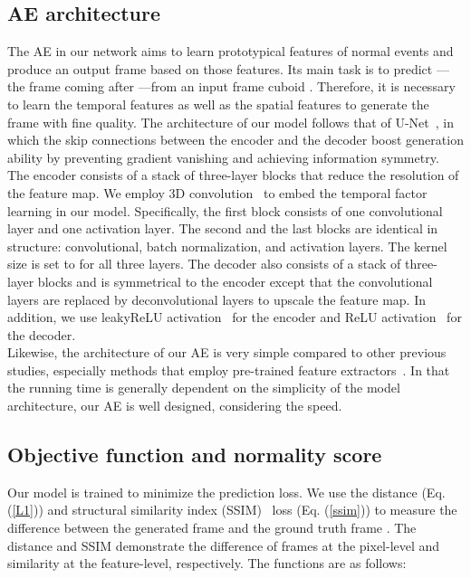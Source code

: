 \documentclass[10pt,twocolumn,letterpaper]{article}
\begin{document}
\subsection{AE architecture}
The AE in our network aims to learn prototypical features of normal events and produce an output frame based on those features. Its main task is to predict —the frame coming after —from an input frame cuboid .  Therefore, it is necessary to learn the temporal features as well as the spatial features to generate the frame with fine quality. The architecture of our model follows that of U-Net~\cite{ronneberger2015u}, in which the skip connections between the encoder and the decoder boost generation ability by preventing gradient vanishing and achieving information symmetry. The encoder consists of a stack of three-layer blocks that reduce the resolution of the feature map. We employ 3D convolution~\cite{tran2015learning} to embed the temporal factor learning in our model. Specifically, the first block consists of one convolutional layer and one activation layer. The second and the last blocks are identical in structure: convolutional, batch normalization, and activation layers. The kernel size is set to  for all three layers. The decoder also consists of a stack of three-layer blocks and is symmetrical to the encoder except that the convolutional layers are replaced by deconvolutional layers to upscale the feature map. In addition, we use leakyReLU activation~\cite{maas2013rectifier} for the encoder and ReLU activation~\cite{nair2010rectified} for the decoder. \\
\indent Likewise, the architecture of our AE is very simple compared to other previous studies, especially methods that employ pre-trained feature extractors~\cite{luo2017revisit, sultani2018real}. In that the running time is generally dependent on the simplicity of the model architecture, our AE is well designed, considering the speed. 

\subsection{Objective function and normality score}
 Our model is trained to minimize the prediction loss. We use the  distance (Eq. (\ref{L1})) and structural similarity index (SSIM)~\cite{wang2004image} loss (Eq. (\ref{ssim})) to measure the difference between the generated frame  and the ground truth frame . The  distance and SSIM demonstrate the difference of frames at the pixel-level and similarity at the feature-level, respectively. The functions are as follows:
\vspace{-0.1cm}
\end{document}
